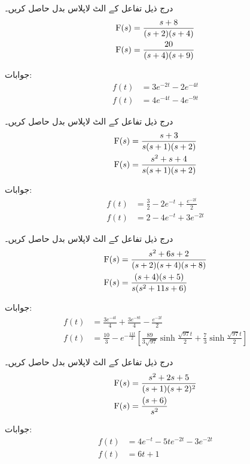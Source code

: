 
درج ذیل تفاعل کے الٹ لاپلاس بدل حاصل کریں۔
\begin{align*}
{\ensuremath{{\textup{F}}}}(s)&=\frac{s+8}{(s+2)(s+4)}\\
{{\textup{F}}}(s)&=\frac{20}{(s+4)(s+9)}
\end{align*}

جوابات:
\begin{align*}
f(t)&=3e^{-2t}-2e^{-4t}\\
f(t)&=4e^{-4t}-4e^{-9t}
\end{align*}

درج ذیل تفاعل کے الٹ لاپلاس بدل حاصل کریں۔
\begin{align*}
{\ensuremath{{\textup{F}}}}(s)&=\frac{s+3}{s(s+1)(s+2)}\\
{{\textup{F}}}(s)&=\frac{s^2+s+4}{s(s+1)(s+2)}
\end{align*}

جوابات:
\begin{align*}
f(t)&=\frac{3}{2}-2e^{-t}+\frac{e^{-2t}}{2}\\
f(t)&=2-4e^{-t}+3e^{-2t}
\end{align*}

درج ذیل تفاعل کے الٹ لاپلاس بدل حاصل کریں۔
\begin{align*}
{\ensuremath{{\textup{F}}}}(s)&=\frac{s^2+6s+2}{(s+2)(s+4)(s+8)}\\
{{\textup{F}}}(s)&=\frac{(s+4)(s+5)}{s(s^2+11s+6)}
\end{align*}

جوابات:
\begin{align*}
f(t)&=\frac{3e^{-4t}}{4}+\frac{3e^{-8t}}{4}-\frac{e^{-2t}}{2}\\
f(t)&=\frac{10}{3}-e^{-\frac{11t}{2}}\left[\frac{89}{3\sqrt{97}}\sinh \frac{\sqrt{97}t}{2}+\frac{7}{3}\sinh \frac{\sqrt{97}t}{2}\right]
\end{align*}

درج ذیل تفاعل کے الٹ لاپلاس بدل حاصل کریں۔
\begin{align*}
{\ensuremath{{\textup{F}}}}(s)&=\frac{s^2+2s+5}{(s+1)(s+2)^2}\\
{{\textup{F}}}(s)&=\frac{(s+6)}{s^2}
\end{align*}

جوابات:
\begin{align*}
f(t)&=4e^{-t}-5te^{-2t}-3e^{-2t}\\
f(t)&=6t+1
\end{align*}

